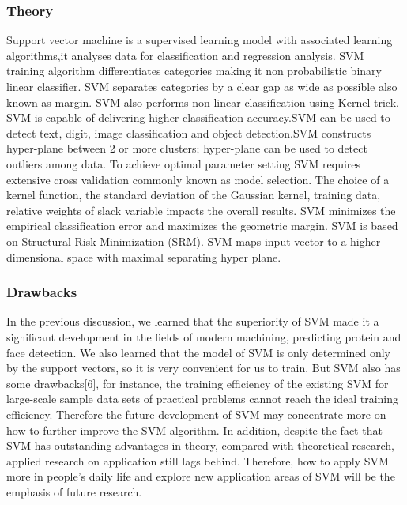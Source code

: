 \documentclass[a4paper]{article}
\begin{document}
\subsubsection{Theory}
Support vector machine is a supervised learning model with associated learning algorithms,it analyses data for classification and regression analysis. SVM training algorithm
differentiates categories making it non probabilistic binary linear classifier. SVM separates categories
by a clear gap as wide as possible also known as margin. SVM also performs non-linear classification
using Kernel trick. SVM is capable of delivering higher classification accuracy.SVM can be used to detect text, digit, image classification and object detection.SVM constructs hyper-plane between 2 or more clusters; hyper-plane can be used to detect outliers among data. To achieve optimal parameter setting SVM requires extensive cross validation commonly known as model selection. The choice of a kernel function, the standard deviation of the Gaussian kernel, training data, relative weights of slack variable impacts the overall results. SVM minimizes the empirical classification error and maximizes the geometric margin. SVM is based on Structural Risk Minimization (SRM). SVM maps input vector to a higher dimensional space with maximal separating hyper plane.\cite{paul2020comparative}
\subsubsection{Drawbacks}
In the previous discussion, we learned that the superiority of SVM made it a significant development in the fields of modern machining, predicting protein and face detection. We also learned that the model of SVM is only determined only by the support vectors, so it is very convenient for us to train. But SVM also has some drawbacks[6], for instance, the training efficiency of the existing SVM for large-scale sample data sets of practical problems cannot reach the ideal training efficiency. Therefore the future development of SVM may concentrate more on how to further improve the SVM algorithm. In addition, despite the fact that SVM has outstanding advantages in theory, compared with theoretical research, applied research on application still lags behind. Therefore, how to apply SVM more in people's daily life and explore new application areas of SVM will be the emphasis of future research.\cite{jun2021development}
\clearpage
\end{document}

